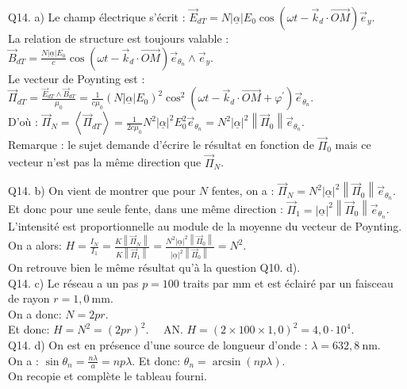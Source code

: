 \documentclass[10pt]{article}
\begin{document}
Q14. a) Le champ électrique s'écrit : \(\vec{E}_{d T}=N|\underline{\alpha}| E_{0} \cos \left(\omega t-\vec{k}_{d} \cdot \overrightarrow{O M}\right) \vec{e}_{y}\).\\
La relation de structure est toujours valable : \(\vec{B}_{d T}=\frac{N|\underline{\alpha}| E_{0}}{c} \cos \left(\omega t-\vec{k}_{d} \cdot \overrightarrow{O M}\right) \vec{e}_{\theta_{n}} \wedge \vec{e}_{y}\).\\
Le vecteur de Poynting est : \(\vec{\Pi}_{d T}=\frac{\vec{E}_{d T} \wedge \vec{B}_{d T}}{\mu_{0}}=\frac{1}{c \mu_{0}}\left(N|\underline{\alpha}| E_{0}\right)^{2} \cos ^{2}\left(\omega t-\vec{k}_{d} \cdot \overrightarrow{O M}+\varphi^{\prime}\right) \vec{e}_{\theta_{n}}\).\\
D'où : \(\vec{\Pi}_{N}=\left\langle\vec{\Pi}_{d T}\right\rangle=\frac{1}{2 c \mu_{0}} N^{2}|\underline{\alpha}|^{2} E_{0}^{2} \vec{e}_{\theta_{n}}=N^{2}|\underline{\alpha}|^{2}\left\|\vec{\Pi}_{0}\right\| \vec{e}_{\theta_{n}}\).\\
Remarque : le sujet demande d'écrire le résultat en fonction de \(\vec{\Pi}_{0}\) mais ce vecteur n'est pas la même direction que \(\vec{\Pi}_{N}\).

Q14. b) On vient de montrer que pour \(N\) fentes, on a : \(\vec{\Pi}_{N}=N^{2}|\underline{\alpha}|^{2}\left\|\vec{\Pi}_{0}\right\| \vec{e}_{\theta_{n}}\).\\
Et donc pour une seule fente, dans une même direction : \(\vec{\Pi}_{1}=|\underline{\alpha}|^{2}\left\|\vec{\Pi}_{0}\right\| \vec{e}_{\theta_{n}}\).\\
L'intensité est proportionnelle au module de la moyenne du vecteur de Poynting.\\
On a alors: \(H=\frac{I_{N}}{I_{1}}=\frac{K\left\|\vec{\Pi}_{N}\right\|}{K\left\|\vec{\Pi}_{1}\right\|}=\frac{N^{2}|\underline{\alpha}|^{2}\left\|\vec{\Pi}_{0}\right\|}{|\underline{\alpha}|^{2}\left\|\vec{\Pi}_{0}\right\|}=N^{2}\).\\
On retrouve bien le même résultat qu'à la question Q10. d).\\
Q14. c) Le réseau a un pas \(p=100\) traits par mm et est éclairé par un faisceau de rayon \(r=1,0 \mathrm{~mm}\).\\
On a donc: \(N=2 p r\).\\
Et donc: \(H=N^{2}=(2 p r)^{2} . \quad\) AN. \(H=(2 \times 100 \times 1,0)^{2}=4,0 \cdot 10^{4}\).\\
Q14. d) On est en présence d'une source de longueur d'onde : \(\lambda=632,8 \mathrm{~nm}\).\\
On a : \(\sin \theta_{n}=\frac{n \lambda}{a}=n p \lambda\). Et donc: \(\theta_{n}=\arcsin (n p \lambda)\).\\
On recopie et complète le tableau fourni.
\end{document}
